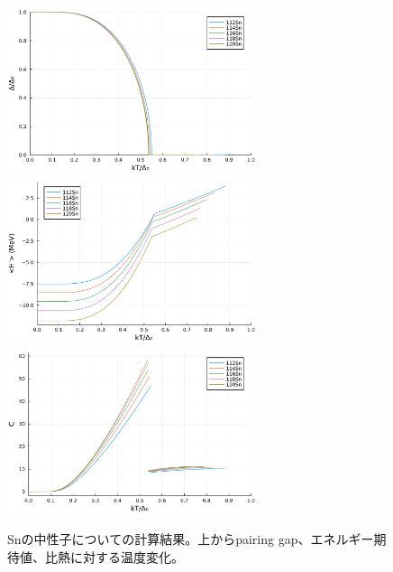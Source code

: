 \documentclass[a4paper,11pt]{jsreport}
\begin{document}
  \newpage
  \begin{figure}[H]
    \centering
    \includegraphics[width=0.65\textwidth]{main_fig/112d.pdf}
    \includegraphics[width=0.65\textwidth]{main_fig/112H.pdf}
    \includegraphics[width=0.65\textwidth]{main_fig/112C.pdf}
    \caption{Snの中性子についての計算結果。上からpairing gap、エネルギー期待値、比熱に対する温度変化。}
  \end{figure}
  \newpage
\end{document}
